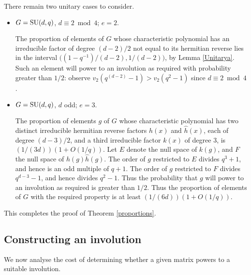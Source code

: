 \documentclass[12pt]{article}
\def\Oh{O}  %
\def\SU{{\rm SU}}
\begin{document}
There remain two unitary cases to consider.
\begin{itemize}
\item $G=\SU(d,q)$, $d\equiv2\bmod4$; $e=2$.

The proportion of elements of $G$ whose characteristic polynomial 
has an irreducible factor of degree $(d-2)/2$ not
equal to its hermitian reverse lies in the interval 
$\big((1-q^{-1})/(d-2), 1/(d-2)\big)$, by Lemma \ref{Unitarya}.
Such an element will power to an involution as required with 
probability greater than $1/2$: observe
$v_2(q^{(d-2)}-1)> v_2(q^2 - 1)$ since $d\equiv2\bmod4$.  

\item 
$G=\SU(d,q)$, $d$ odd; $e=3$.

The proportion of elements $g$ of $G$ whose characteristic
polynomial has two distinct irreducible hermitian reverse factors 
$h(x)$ and $\hat{h}(x)$,
each of degree $(d-3)/2$, and a third irreducible factor $k(x)$ of degree $3$,
is $(1/(3d))(1+\Oh(1/q))$.
Let $E$ denote the null space of $k(g)$, and $F$ the null space 
of $h(g)\hat{h}(g)$.
The order of $g$ restricted to $E$ divides 
$q^3+1$, and hence is an odd multiple of $q+1$.  The order of $g$
restricted to $F$ divides $q^{d-3}-1$, and hence divides $q^2-1$.
Thus the probability that $g$ will power to an involution as required is
greater than $1/2$.  Thus the proportion of elements of $G$ with the
required property is at least $(1/(6d))(1+\Oh(1/q))$.
\end{itemize}
This completes the proof of Theorem \ref{proportions}.

\subsection{Constructing an involution}
We now analyse the cost of determining whether 
a given matrix powers to a suitable involution.
\end{document}
